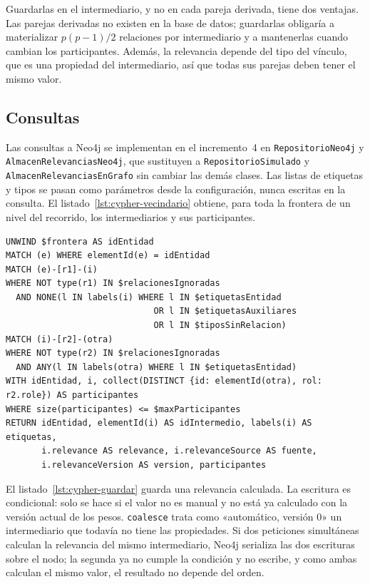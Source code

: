 Guardarlas en el intermediario, y no en cada pareja derivada, tiene dos ventajas. Las parejas derivadas no existen en la base de datos; guardarlas obligaría a materializar $p(p-1)/2$ relaciones por intermediario y a mantenerlas cuando cambian los participantes. Además, la relevancia depende del tipo del vínculo, que es una propiedad del intermediario, así que todas sus parejas deben tener el mismo valor.

\subsection{Consultas}

Las consultas a Neo4j se implementan en el incremento~4 en \texttt{RepositorioNeo4j} y \texttt{AlmacenRelevanciasNeo4j}, que sustituyen a \texttt{RepositorioSimulado} y \texttt{AlmacenRelevanciasEnGrafo} sin cambiar las demás clases. Las listas de etiquetas y tipos se pasan como parámetros desde la configuración, nunca escritas en la consulta. El listado~\ref{lst:cypher-vecindario} obtiene, para toda la frontera de un nivel del recorrido, los intermediarios y sus participantes.

\begin{lstlisting}[style=codigo, caption={Consulta prevista: intermediarios de la frontera de un nivel.}, label={lst:cypher-vecindario}]
UNWIND $frontera AS idEntidad
MATCH (e) WHERE elementId(e) = idEntidad
MATCH (e)-[r1]-(i)
WHERE NOT type(r1) IN $relacionesIgnoradas
  AND NONE(l IN labels(i) WHERE l IN $etiquetasEntidad
                             OR l IN $etiquetasAuxiliares
                             OR l IN $tiposSinRelacion)
MATCH (i)-[r2]-(otra)
WHERE NOT type(r2) IN $relacionesIgnoradas
  AND ANY(l IN labels(otra) WHERE l IN $etiquetasEntidad)
WITH idEntidad, i, collect(DISTINCT {id: elementId(otra), rol: r2.role}) AS participantes
WHERE size(participantes) <= $maxParticipantes
RETURN idEntidad, elementId(i) AS idIntermedio, labels(i) AS etiquetas,
       i.relevance AS relevance, i.relevanceSource AS fuente,
       i.relevanceVersion AS version, participantes
\end{lstlisting}

El listado~\ref{lst:cypher-guardar} guarda una relevancia calculada. La escritura es condicional: solo se hace si el valor no es manual y no está ya calculado con la versión actual de los pesos. \texttt{coalesce} trata como «automático, versión 0» un intermediario que todavía no tiene las propiedades. Si dos peticiones simultáneas calculan la relevancia del mismo intermediario, Neo4j serializa las dos escrituras sobre el nodo; la segunda ya no cumple la condición y no escribe, y como ambas calculan el mismo valor, el resultado no depende del orden.

